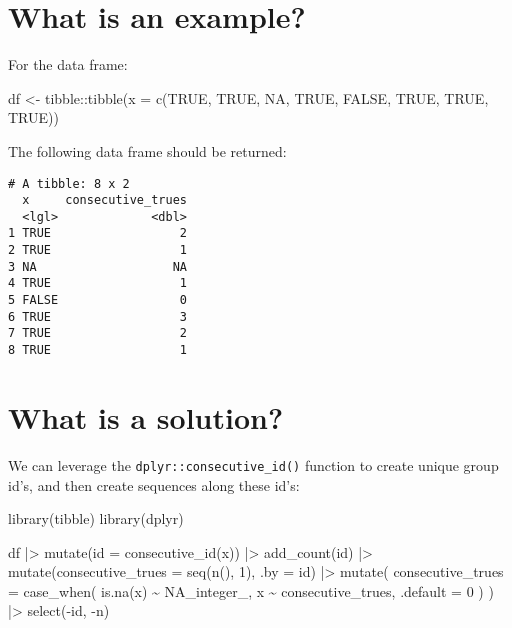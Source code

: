 \documentclass[
  letterpaper,
  DIV=11,
  numbers=noendperiod]{scrreprt}
\newenvironment{Shaded}{\begin{snugshade}}{\end{snugshade}}
\newcommand{\AttributeTok}[1]{\textcolor[rgb]{0.40,0.45,0.13}{#1}}
\newcommand{\ConstantTok}[1]{\textcolor[rgb]{0.56,0.35,0.01}{#1}}
\newcommand{\DecValTok}[1]{\textcolor[rgb]{0.68,0.00,0.00}{#1}}
\newcommand{\FunctionTok}[1]{\textcolor[rgb]{0.28,0.35,0.67}{#1}}
\newcommand{\NormalTok}[1]{\textcolor[rgb]{0.00,0.23,0.31}{#1}}
\newcommand{\OtherTok}[1]{\textcolor[rgb]{0.00,0.23,0.31}{#1}}
\newcommand{\SpecialCharTok}[1]{\textcolor[rgb]{0.37,0.37,0.37}{#1}}
\begin{document}
\section{What is an example?}\label{what-is-an-example-3}

For the data frame:

\begin{Shaded}
\begin{Highlighting}[]
\NormalTok{df }\OtherTok{\textless{}{-}}\NormalTok{ tibble}\SpecialCharTok{::}\FunctionTok{tibble}\NormalTok{(}\AttributeTok{x =} \FunctionTok{c}\NormalTok{(}\ConstantTok{TRUE}\NormalTok{, }\ConstantTok{TRUE}\NormalTok{, }\ConstantTok{NA}\NormalTok{, }\ConstantTok{TRUE}\NormalTok{, }\ConstantTok{FALSE}\NormalTok{, }\ConstantTok{TRUE}\NormalTok{, }\ConstantTok{TRUE}\NormalTok{, }\ConstantTok{TRUE}\NormalTok{))}
\end{Highlighting}
\end{Shaded}

The following data frame should be returned:

\begin{verbatim}
# A tibble: 8 x 2
  x     consecutive_trues
  <lgl>             <dbl>
1 TRUE                  2
2 TRUE                  1
3 NA                   NA
4 TRUE                  1
5 FALSE                 0
6 TRUE                  3
7 TRUE                  2
8 TRUE                  1
\end{verbatim}

\section{What is a solution?}\label{what-is-a-solution-3}

We can leverage the \texttt{dplyr::consecutive\_id()} function to create
unique group id's, and then create sequences along these id's:

\begin{Shaded}
\begin{Highlighting}[]
\FunctionTok{library}\NormalTok{(tibble)}
\FunctionTok{library}\NormalTok{(dplyr)}

\NormalTok{df }\SpecialCharTok{|\textgreater{}}
  \FunctionTok{mutate}\NormalTok{(}\AttributeTok{id =} \FunctionTok{consecutive\_id}\NormalTok{(x)) }\SpecialCharTok{|\textgreater{}}
  \FunctionTok{add\_count}\NormalTok{(id) }\SpecialCharTok{|\textgreater{}}
  \FunctionTok{mutate}\NormalTok{(}\AttributeTok{consecutive\_trues =} \FunctionTok{seq}\NormalTok{(}\FunctionTok{n}\NormalTok{(), }\DecValTok{1}\NormalTok{), }\AttributeTok{.by =}\NormalTok{ id) }\SpecialCharTok{|\textgreater{}}
  \FunctionTok{mutate}\NormalTok{(}
    \AttributeTok{consecutive\_trues =} \FunctionTok{case\_when}\NormalTok{(}
      \FunctionTok{is.na}\NormalTok{(x) }\SpecialCharTok{\textasciitilde{}} \ConstantTok{NA\_integer\_}\NormalTok{,}
\NormalTok{      x }\SpecialCharTok{\textasciitilde{}}\NormalTok{ consecutive\_trues,}
      \AttributeTok{.default =} \DecValTok{0}
\NormalTok{    )}
\NormalTok{  ) }\SpecialCharTok{|\textgreater{}}
  \FunctionTok{select}\NormalTok{(}\SpecialCharTok{{-}}\NormalTok{id, }\SpecialCharTok{{-}}\NormalTok{n)}
\end{Highlighting}
\end{Shaded}
\end{document}
